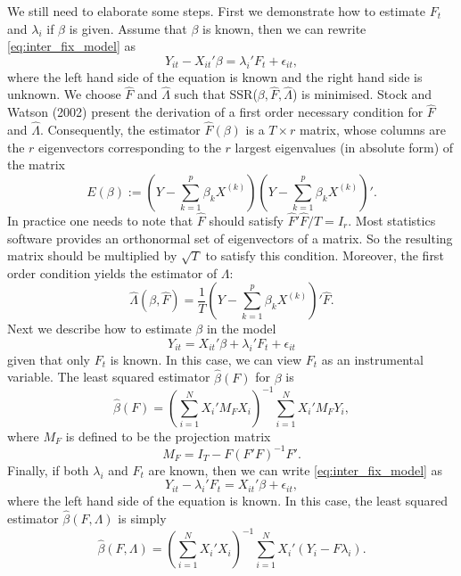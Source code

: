 \documentclass[a4paper]{article}
\begin{document}
We still need to elaborate some steps. First we demonstrate how to estimate $F_t$ and $\lambda_i$ if $\beta$ is given. Assume that $\beta$ is known, then we can rewrite \eqref{eq:inter_fix_model} as
\[
	Y_{it}-X_{it}'\beta=\lambda_i'F_t+\epsilon_{it},
\]
where the left hand side of the equation is known and the right hand side is unknown. We choose $\hat F$ and $\hat \Lambda$ such that SSR($\beta, \hat F, \hat \Lambda$) is minimised. Stock and Watson (2002) present the derivation of a first order necessary condition for $\hat F$ and $\hat \Lambda$. Consequently, the estimator $\hat F(\beta)$ is a $T\times r$ matrix, whose columns are the $r$ eigenvectors corresponding to the $r$ largest eigenvalues (in absolute form) of the matrix
\begin{equation}\label{mat_for_ev}
	E(\beta):=\left(Y-\sum_{k=1}^{p}\beta_kX^{(k)}\right)\left(Y-\sum_{k=1}^{p}\beta_kX^{(k)}\right)'.
\end{equation}
In practice one needs to note that $\hat F$ should satisfy $\hat F'\hat F/T=I_r$. Most statistics software provides an orthonormal set of eigenvectors of a matrix. So the resulting matrix should be multiplied by $\sqrt T$ to satisfy this condition. Moreover, the first order condition yields the estimator of $\Lambda$:
\begin{equation}\label{lambda_est}
	\hat \Lambda(\beta,\hat F)=\frac{1}{T}\left(Y-\sum_{k=1}^{p}\beta_kX^{(k)}\right)'\hat F.
\end{equation}
Next we describe how to estimate $\beta$ in the model
\[
	Y_{it}=X_{it}'\beta+\lambda_i'F_t+\epsilon_{it}
\]
given that only $F_t$ is known.  In this case, we can view $F_t$ as an instrumental variable. The least squared estimator $\hat \beta(F)$ for $\beta$ is
\begin{equation}\label{est_beta_F}
	\hat \beta(F)=\left(\sum_{i=1}^{N}X_i'M_FX_i\right)^{-1}\sum_{i=1}^{N}X_i'M_FY_i,
\end{equation}
where $M_F$ is defined to be the projection matrix
\[
	M_F=I_T-F(F'F)^{-1}F'.
\]
Finally, if both $\lambda_i$ and $F_t$ are known, then we can write \eqref{eq:inter_fix_model} as
\[
	Y_{it}-\lambda_i'F_t=X_{it}'\beta+\epsilon_{it},
\]
where the left hand side of the equation is known. In this case, the least squared estimator $\hat \beta(F,\Lambda)$ is simply
\begin{equation}\label{est_beta_F_lambda}
	\hat \beta(F,\Lambda)=\left(\sum_{i=1}^{N}X_i'X_i\right)^{-1}\sum_{i=1}^{N}X_i'(Y_i-F\lambda_i).
\end{equation}
\end{document}
